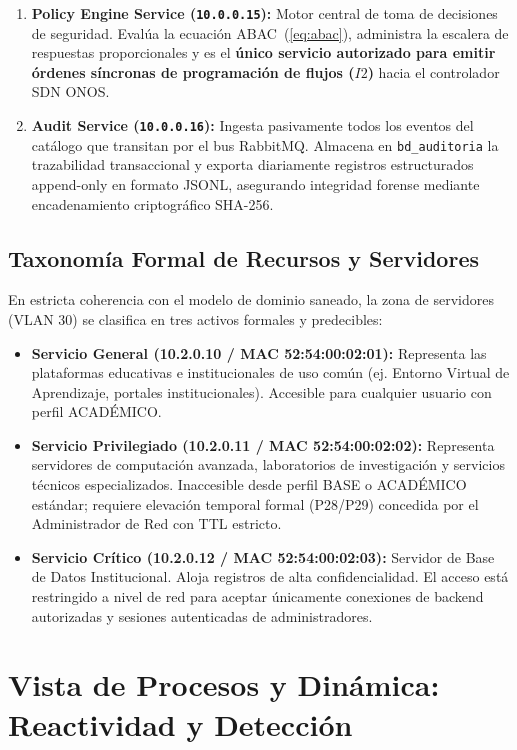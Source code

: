 \documentclass[11pt,a4paper]{report}
\begin{document}
\begin{enumerate}[leftmargin=*]
    \item \textbf{Policy Engine Service (\texttt{10.0.0.15}):} Motor central de toma de decisiones de seguridad. Evalúa la ecuación ABAC~(\ref{eq:abac}), administra la escalera de respuestas proporcionales y es el \textbf{único servicio autorizado para emitir órdenes síncronas de programación de flujos ($I2$)} hacia el controlador SDN ONOS.
    \item \textbf{Audit Service (\texttt{10.0.0.16}):} Ingesta pasivamente todos los eventos del catálogo que transitan por el bus RabbitMQ. Almacena en \texttt{bd\_auditoria} la trazabilidad transaccional y exporta diariamente registros estructurados append-only en formato JSONL, asegurando integridad forense mediante encadenamiento criptográfico SHA-256.
\end{enumerate}

\section{Taxonomía Formal de Recursos y Servidores}
En estricta coherencia con el modelo de dominio saneado, la zona de servidores (VLAN 30) se clasifica en tres activos formales y predecibles:
\begin{itemize}[leftmargin=*]
    \item \textbf{Servicio General (10.2.0.10 / MAC 52:54:00:02:01):} Representa las plataformas educativas e institucionales de uso común (ej. Entorno Virtual de Aprendizaje, portales institucionales). Accesible para cualquier usuario con perfil ACADÉMICO.
    \item \textbf{Servicio Privilegiado (10.2.0.11 / MAC 52:54:00:02:02):} Representa servidores de computación avanzada, laboratorios de investigación y servicios técnicos especializados. Inaccesible desde perfil BASE o ACADÉMICO estándar; requiere elevación temporal formal (P28/P29) concedida por el Administrador de Red con TTL estricto.
    \item \textbf{Servicio Crítico (10.2.0.12 / MAC 52:54:00:02:03):} Servidor de Base de Datos Institucional. Aloja registros de alta confidencialidad. El acceso está restringido a nivel de red para aceptar únicamente conexiones de backend autorizadas y sesiones autenticadas de administradores.
\end{itemize}

\chapter{Vista de Procesos y Dinámica: Reactividad y Detección}
\end{document}
